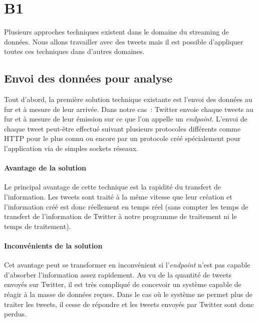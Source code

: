 \section{B1}
\label{sec:B1}

Plusieurs approches techniques existent dans le domaine du streaming de données. Nous allons travailler avec des tweets mais il est possible d'appliquer toutes ces techniques dans d'autres domaines.\\

\subsection{Envoi des données pour analyse}
\label{sub:Envoi des données pour analyse}

  Tout d'abord, la première solution technique existante est l'envoi des données au fur et à mesure de leur arrivée. Dans notre cas : Twitter envoie chaque tweets au fur et à mesure de leur émission sur ce que l'on appelle un \textit{endpoint}. L'envoi de chaque tweet peut-être effectué suivant plusieurs protocoles différents comme HTTP pour le plus connu ou encore par un protocole créé spécialement pour l'application via de simples sockets réseaux.\\

  \paragraph{Avantage de la solution}
  \label{par:Avantage de la solution}
  Le principal avantage de cette technique est la rapidité du transfert de l'information. Les tweets sont traité à la même vitesse que leur création et l'information créé est donc réellement en temps réel (sans compter les temps de transfert de l'information de Twitter à notre programme de traitement ni le temps de traitement).

  \paragraph{Inconvénients de la solution}
  \label{par:Inconvénients de la solution}
  Cet avantage peut se transformer en inconvénient si l'\textit{endpoint} n'est pas capable d'absorber l'information assez rapidement. Au vu de la quantité de tweets envoyés sur Twitter, il est très compliqué de concevoir un système capable de réagir à la masse de données reçues. Dans le cas où le système ne permet plus de traiter les tweets, il cesse de répondre et les tweets envoyés par Twitter sont donc perdus.\\

